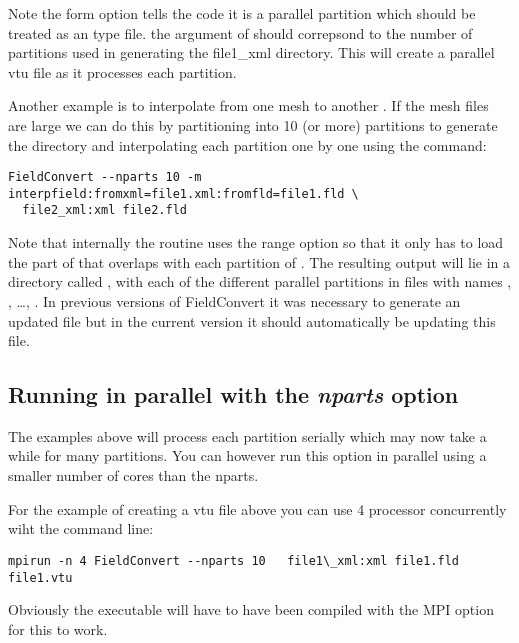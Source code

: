 Note the form  option tells the code it is a
parallel partition which should be treated as an  type
file. the argument of  should correpsond to the number
of partitions used in generating the file1\_xml directory. This will
create a parallel vtu file as it processes each partition.


Another example is to interpolate  from one mesh
 to another . If the mesh files are
large we can do this by partitioning  into 10 (or
more) partitions to generate the  directory and
interpolating each partition one by one using the command:
\begin{lstlisting}[style=BashInputStyle]
  FieldConvert --nparts 10 -m interpfield:fromxml=file1.xml:fromfld=file1.fld \
  file2_xml:xml file2.fld
\end{lstlisting}
Note that internally the routine uses the range option so that it only
has to load the part of \inltt{file1.xml} that overlaps with each
partition of \inltt{file2.xml}.  The resulting output will lie in a
directory called \inltt{file2.fld}, with each of the different
parallel partitions in files with names ,
, \dots, . In previous
versions of FieldConvert it was necessary to generate an updated
\inltt{Info.xml} file but in the current version it should
automatically be updating this file.

\subsection{Running in parallel with the \textit{ nparts} option}

The examples above will process each partition serially which may now
take a while for many partitions. You can however run this option in
parallel using a smaller number of cores than the nparts.

For the example of creating a vtu file above you can use 4 processor
concurrently wiht the command line:
\begin{lstlisting}[style=BashInputStyle]
mpirun -n 4 FieldConvert --nparts 10   file1\_xml:xml file1.fld file1.vtu
\end{lstlisting}

Obviously the executable will have to have been compiled with the MPI
option for this to work.


